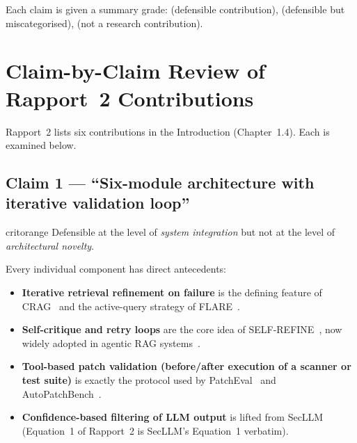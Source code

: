 \documentclass[11pt, a4paper]{report}
\begin{document}
Each claim is given a summary grade:
 (defensible contribution),
 (defensible but miscategorised),
 (not a research contribution).

\chapter{Claim-by-Claim Review of Rapport~2 Contributions}
\label{chap:claims}

Rapport~2 lists six contributions in the Introduction (Chapter~1.4). Each is
examined below.

\section{Claim 1 --- ``Six-module architecture with iterative validation loop''}

\begin{gradebox}{critorange}
Defensible at the level of \emph{system integration} but not at the level of
\emph{architectural novelty}.
\end{gradebox}

Every individual component has direct antecedents:

\begin{itemize}
  \item \textbf{Iterative retrieval refinement on failure} is the defining
        feature of CRAG~\citep{yao2024crag} and the active-query strategy of
        FLARE~\citep{jiang2023flare}.
  \item \textbf{Self-critique and retry loops} are the core idea of
        SELF-REFINE~\citep{madaan2023selfrefine}, now widely adopted in
        agentic RAG systems~\citep{agenticrag2025survey}.
  \item \textbf{Tool-based patch validation (before/after execution of a
        scanner or test suite)} is exactly the protocol used by
        PatchEval~\citep{lyu2024patcheval} and
        AutoPatchBench~\citep{autopatchbench2025}.
  \item \textbf{Confidence-based filtering of LLM output} is lifted from
        SecLLM~\citep{devito2025secllm} (Equation~1 of Rapport~2 is SecLLM's
        Equation~1 verbatim).
\end{itemize}
\end{document}

